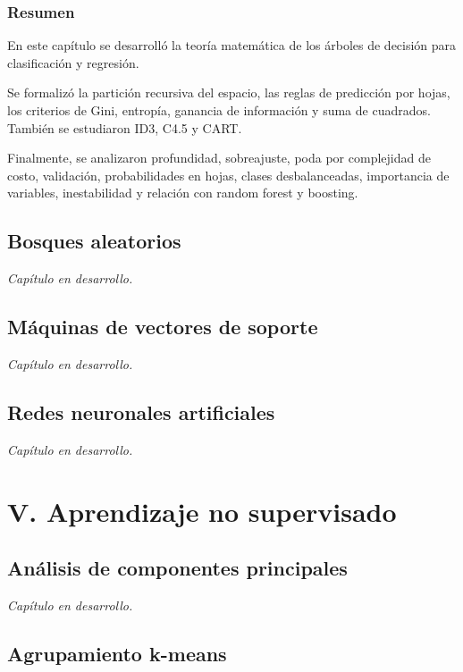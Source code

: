 \documentclass[
  spanish,
  11pt,
  letterpaper,
  DIV=11,
  numbers=noendperiod]{scrreprt}
\theoremstyle{definition}
\theoremstyle{plain}
\theoremstyle{definition}
\theoremstyle{remark}
\begin{document}
\section{Resumen}\label{resumen-12}

En este capítulo se desarrolló la teoría matemática de los árboles de
decisión para clasificación y regresión.

Se formalizó la partición recursiva del espacio, las reglas de
predicción por hojas, los criterios de Gini, entropía, ganancia de
información y suma de cuadrados. También se estudiaron ID3, C4.5 y CART.

Finalmente, se analizaron profundidad, sobreajuste, poda por complejidad
de costo, validación, probabilidades en hojas, clases desbalanceadas,
importancia de variables, inestabilidad y relación con random forest y
boosting.

\chapter{Bosques aleatorios}\label{bosques-aleatorios}

\emph{Capítulo en desarrollo.}

\chapter{Máquinas de vectores de
soporte}\label{muxe1quinas-de-vectores-de-soporte}

\emph{Capítulo en desarrollo.}

\chapter{Redes neuronales
artificiales}\label{redes-neuronales-artificiales}

\emph{Capítulo en desarrollo.}

\part{V. Aprendizaje no supervisado}

\chapter{Análisis de componentes
principales}\label{anuxe1lisis-de-componentes-principales}

\emph{Capítulo en desarrollo.}

\chapter{Agrupamiento k-means}\label{agrupamiento-k-means}
\end{document}
